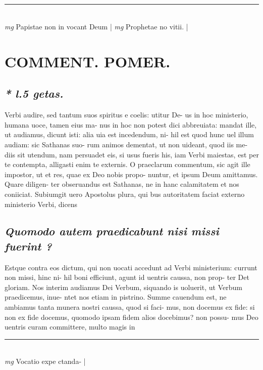 \documentclass{article}
\begin{document}
\begin{pages}
\subsection*{\textit{}}
\vspace{0.5cm}\noindent
\vspace{0.2cm}\rule{1cm}{0.2pt}\\ 
\hspace{0.2cm}\textit{mg}
\footnotesize Papistae non in vocant Deum 
\normalsize| 
\hspace{0.2cm}\textit{mg}
\footnotesize Prophetae no vitii.  
\normalsize| 
\section*{COMMENT. POMER.  }
{}
\subsection*{\textit{* l.5 getas.  }}\pstart Verbi audire, sed tantum suos spiritus e coelis: utitur De- us in hoc ministerio, humana uoce, tamen eius ma- nus in hoc non potest dici abbreuiata: mandat ille, ut audiamus, dicunt isti: alia uia est incedendum, ni- hil est quod hunc uel illum audiam: sic Sathanas suo- rum animos dementat, ut non uideant, quod iis me- diis sit utendum, nam persuadet eis, si usus fueris his, iam Verbi maiestas, est per te contempta, alligasti enim te externis. O praeclarum commentum, sic agit ille impostor, ut et res, quae ex Deo nobis propo- nuntur, et ipsum Deum amittamus. Quare diligen- ter obseruandus est Sathanas, ne in hanc calamitatem et nos coniiciat. Subiumgit uero Apostolus plura, qui bus autoritatem faciat externo ministerio Verbi, dicens  \pend
{}
{}
\subsection*{\textit{Quomodo autem praedicabunt nisi missi fuerint ? }}\pstart Estque contra eos dictum, qui non uocati accedunt ad Verbi ministerium: currunt non missi, hinc ni- hil boni efficiunt, agunt id uentris caussa, non prop- ter Det gloriam. Nos interim audiamus Dei Verbum, siquando is uoluerit, ut Verbum praedicemus, inue- ntet nos etiam in pistrino. Summe cauendum est, ne ambiamus tanta munera nostri caussa, quod si faci- mus, non docemus ex fide: si non ex fide docemus, quomodo ipsam fidem alios docebimus? non possu- mus Deo uentris curam committere, multo magis in  \pend
\vspace{0.5cm}\noindent
\vspace{0.2cm}\rule{1cm}{0.2pt}\\ 
\hspace{0.2cm}\textit{mg}
\footnotesize Vocatio expe ctanda- 
\normalsize| 

\end{pages}
\end{document}
